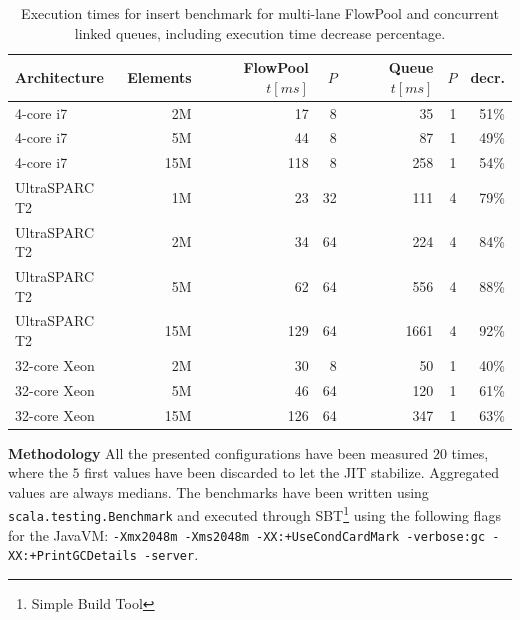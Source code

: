 \documentclass[runningheads,a4paper]{llncs}
\begin{document}
\begin{table}[t]
\centering
\begin{tabular}{l@{\qquad}r@{\quad}r@{\quad}r@{\quad}r@{\quad}r@{\qquad}r}
  Architecture & Elements & FlowPool $t [ms]$ & $P$ & Queue $t [ms]$ & $P$ & decr.\\
\hline
    4-core i7 &  2M &  17 &  8 &   35 & 1 & 51\%\\
    4-core i7 &  5M &  44 &  8 &   87 & 1 & 49\%\\
    4-core i7 & 15M & 118 &  8 &  258 & 1 & 54\%\\
\hline
UltraSPARC T2 &  1M &  23 & 32 &  111 & 4 & 79\%\\
UltraSPARC T2 &  2M &  34 & 64 &  224 & 4 & 84\%\\
UltraSPARC T2 &  5M &  62 & 64 &  556 & 4 & 88\%\\
UltraSPARC T2 & 15M & 129 & 64 & 1661 & 4 & 92\%\\
\hline
 32-core Xeon &  2M &  30 &  8 &   50 & 1 & 40\%\\
 32-core Xeon &  5M &  46 & 64 &  120 & 1 & 61\%\\
 32-core Xeon & 15M & 126 & 64 &  347 & 1 & 63\%\\
\end{tabular}

\caption{Execution times for insert benchmark for multi-lane FlowPool
  and concurrent linked queues, including execution time decrease
  percentage.} \label{tbl:execution-times}
\end{table}

\textbf{Methodology} All the presented configurations have been
measured $20$ times, where the $5$ first values have been discarded to
let the JIT stabilize. Aggregated values are always medians. The
benchmarks have been written using \verb=scala.testing.Benchmark= and
executed through SBT\footnote{Simple Build Tool} using the following
flags for the JavaVM: \texttt{-Xmx2048m -Xms2048m -XX:+UseCondCardMark
  -verbose:gc -XX:+PrintGCDetails -server}.
\end{document}
